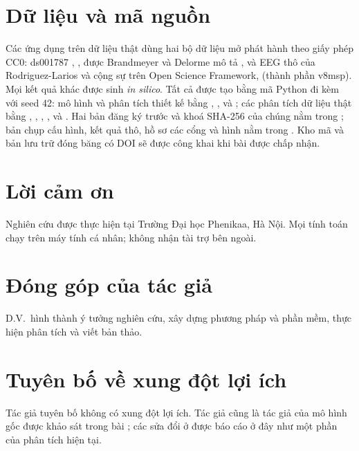 \section*{Dữ liệu và mã nguồn}
\begingroup\raggedright
Các ứng dụng trên dữ liệu thật dùng hai bộ dữ liệu mở phát hành theo giấy phép CC0: ds001787 \citep{Delorme2024ds}, , được Brandmeyer và Delorme mô tả \citep{Brandmeyer2018}, và EEG thô của Rodriguez-Larios và cộng sự \citep{RodriguezLarios2021} trên Open Science Framework,  (thành phần v8msp). Mọi kết quả khác được sinh \emph{in silico}. Tất cả được tạo bằng mã Python đi kèm với seed 42: mô hình và phân tích thiết kế bằng , ,  và ; các phân tích dữ liệu thật bằng , , , ,  và . Hai bản đăng ký trước và khoá SHA-256 của chúng nằm trong ; bản chụp cấu hình, kết quả thô, hồ sơ các cổng và hình nằm trong . Kho mã và bản lưu trữ đóng băng có DOI sẽ được công khai khi bài được chấp nhận.
\par\endgroup

\section*{Lời cảm ơn}
Nghiên cứu được thực hiện tại Trường Đại học Phenikaa, Hà Nội. Mọi tính toán chạy trên máy tính cá nhân; không nhận tài trợ bên ngoài. %

\section*{Đóng góp của tác giả}
D.V.\ hình thành ý tưởng nghiên cứu, xây dựng phương pháp và phần mềm, thực hiện phân tích và viết bản thảo.

\section*{Tuyên bố về xung đột lợi ích}
Tác giả tuyên bố không có xung đột lợi ích. Tác giả cũng là tác giả của mô hình gốc được khảo sát trong bài \citep{BQI}; các sửa đổi ở  được báo cáo ở đây như một phần của phân tích hiện tại.

